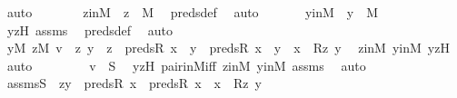 \begin{isabellebody}
\ auto\isanewline
\ \ \ \ \isamarkupfalse%
\ \isamarkupfalse%
\ zinM\ {\isacharcolon}{\kern0pt}\ {\isachardoublequoteopen}z\ {\isasymin}\ M{\isachardoublequoteclose}\ \isamarkupfalse%
\ preds{\isacharunderscore}{\kern0pt}def\ \isamarkupfalse%
\ auto\ \isanewline
\ \ \ \ \isamarkupfalse%
\ yinM\ {\isacharcolon}{\kern0pt}\ {\isachardoublequoteopen}y\ {\isasymin}\ M{\isachardoublequoteclose}\ \isamarkupfalse%
\ yzH\ assms\ \isamarkupfalse%
\ preds{\isacharunderscore}{\kern0pt}def\ \isamarkupfalse%
\ auto\ \isanewline
\ \ \ \ \isamarkupfalse%
\ \isamarkupfalse%
\ {\isachardoublequoteopen}{\isacharparenleft}{\kern0pt}{\isasymexists}y{\isasymin}M{\isachardot}{\kern0pt}\ {\isasymexists}z{\isasymin}M{\isachardot}{\kern0pt}\ v\ {\isacharequal}{\kern0pt}\ {\isasymlangle}z{\isacharcomma}{\kern0pt}\ y{\isasymrangle}\ {\isasymand}\ z\ {\isasymin}\ preds{\isacharparenleft}{\kern0pt}R{\isacharcomma}{\kern0pt}\ x{\isacharparenright}{\kern0pt}\ {\isasymand}\ {\isacharparenleft}{\kern0pt}y\ {\isasymin}\ preds{\isacharparenleft}{\kern0pt}R{\isacharcomma}{\kern0pt}\ x{\isacharparenright}{\kern0pt}\ {\isasymor}\ y\ {\isacharequal}{\kern0pt}\ x{\isacharparenright}{\kern0pt}\ {\isasymand}\ R{\isacharparenleft}{\kern0pt}z{\isacharcomma}{\kern0pt}\ y{\isacharparenright}{\kern0pt}{\isacharparenright}{\kern0pt}{\isachardoublequoteclose}\ \isamarkupfalse%
\ zinM\ yinM\ yzH\ \isamarkupfalse%
\ auto\ \isanewline
\ \ \ \ \isamarkupfalse%
\ \isamarkupfalse%
\ {\isachardoublequoteopen}v\ {\isasymin}\ S{\isachardoublequoteclose}\ \isamarkupfalse%
\ yzH\ pair{\isacharunderscore}{\kern0pt}in{\isacharunderscore}{\kern0pt}M{\isacharunderscore}{\kern0pt}iff\ zinM\ yinM\ assms{}\ \isamarkupfalse%
\ auto\isanewline
\ \ \isamarkupfalse%
\ \isanewline
\ \ \ \ \isamarkupfalse%
\ assms{}{\isacharcolon}{\kern0pt}{\isachardoublequoteopen}S\ {\isacharequal}{\kern0pt}\ {\isacharbraceleft}{\kern0pt}{\isasymlangle}z{\isacharcomma}{\kern0pt}y{\isasymrangle}\ {\isasymin}\ preds{\isacharparenleft}{\kern0pt}R{\isacharcomma}{\kern0pt}\ x{\isacharparenright}{\kern0pt}\ {\isasymtimes}\ {\isacharparenleft}{\kern0pt}preds{\isacharparenleft}{\kern0pt}R{\isacharcomma}{\kern0pt}\ x{\isacharparenright}{\kern0pt}\ {\isasymunion}\ {\isacharbraceleft}{\kern0pt}x{\isacharbraceright}{\kern0pt}{\isacharparenright}{\kern0pt}\ {\isachardot}{\kern0pt}\ R{\isacharparenleft}{\kern0pt}z{\isacharcomma}{\kern0pt}\ y{\isacharparenright}{\kern0pt}{\isacharbraceright}{\kern0pt}{\isachardoublequoteclose}\ \isanewline

\end{isabellebody}
